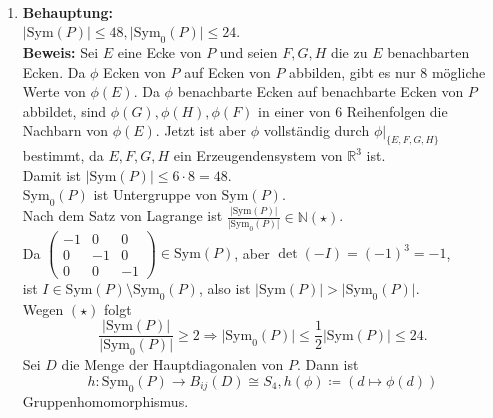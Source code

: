 \begin{solution}
  \
  \begin{enumerate}[label= (\alph*)] 
    \item \textbf{Behauptung:} \\
    \( \vert \text{Sym}(P) \vert \leq 48, \vert \text{Sym}_0(P) \vert \leq 24 \). \\
    \textbf{Beweis:} Sei \( E \) eine Ecke von \( P \) und seien \( F,G,H \) die zu \( E \) benachbarten Ecken. Da \( \phi \) Ecken von \( P \) auf Ecken von \( P \) abbilden, gibt es nur 8 mögliche Werte von \( \phi(E) \). Da \( \phi \) benachbarte Ecken auf benachbarte Ecken von \( P \) abbildet, sind \( \phi(G), \phi(H), \phi(F) \) in einer von 6 Reihenfolgen die Nachbarn von \( \phi(E) \). Jetzt ist aber \( \phi \) vollständig durch \( \phi|_{\{ E,F,G,H \}} \) bestimmt, da \( E,F,G,H \) ein Erzeugendensystem von \( \mathbb{R}^3 \) ist. \\
    Damit ist \( \vert \text{Sym}(P) \vert \leq 6 \cdot 8 = 48 \). \\
    \( \text{Sym}_0(P) \) ist Untergruppe von \( \text{Sym}(P) \). \\
    Nach dem Satz von Lagrange ist \( \frac{\vert \text{Sym}(P) \vert}{\vert \text{Sym}_0(P) \vert} \in \mathbb{N} (\star) \). \\
    Da \( \begin{pmatrix}
      -1 & 0 & 0 \\
      0 & -1 & 0 \\
      0 & 0 & -1 
    \end{pmatrix} \in \text{Sym}(P) \), aber \( \det(-I) = {(-1)}^3 = -1 \),\\
    ist \( I \in \text{Sym}(P) \setminus \text{Sym}_0(P) \), also ist \( \vert \text{Sym}(P) \vert > \vert \text{Sym}_0(P) \vert \). \\
    Wegen \( (\star) \) folgt
    \begin{equation*}
      \frac{\vert \text{Sym}(P) \vert}{\vert \text{Sym}_0(P) \vert} \geq 2 \Rightarrow \vert \text{Sym}_0(P) \vert \leq \frac{1}{2} \vert \text{Sym}(P) \vert \leq 24.
    \end{equation*}
    Sei \( D \) die Menge der Hauptdiagonalen von \( P \). Dann ist 
    \begin{equation*}
      h: \text{Sym}_0(P) \to B_{ij}(D) \cong S_4, h(\phi) \coloneqq (d \mapsto \phi(d))
    \end{equation*}
    Gruppenhomomorphismus. \\
    

\end{enumerate}
\end{solution}

